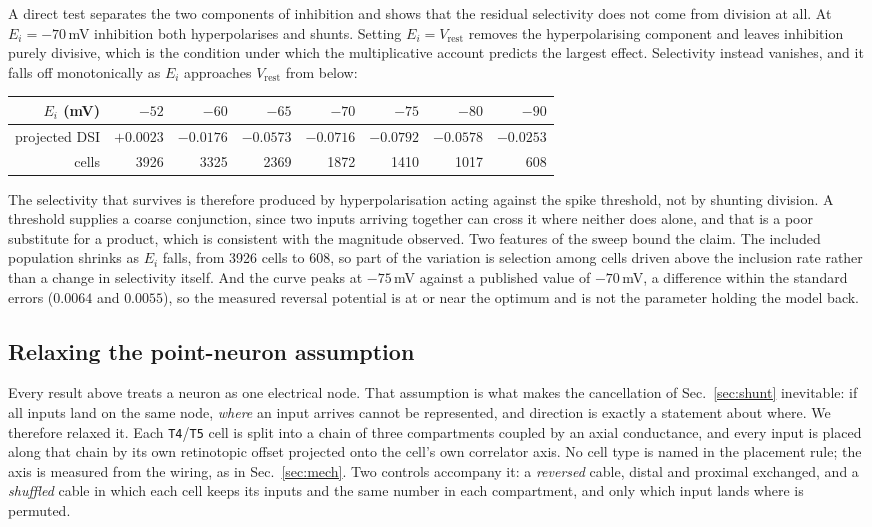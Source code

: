 \documentclass[10pt,twoside]{article}
\newcommand{\cell}[1]{\texttt{#1}}
\begin{document}
A direct test separates the two components of inhibition and shows that the
residual selectivity does not come from division at all. At
$E_i = -70$\,mV inhibition both hyperpolarises and shunts. Setting
$E_i = V_{\mathrm{rest}}$ removes the hyperpolarising component and leaves
inhibition purely divisive, which is the condition under which the
multiplicative account predicts the largest effect. Selectivity instead
vanishes, and it falls off monotonically as $E_i$ approaches
$V_{\mathrm{rest}}$ from below:

\begin{center}
\small
\begin{tabular}{rrrrrrrr}
\toprule
$E_i$ (mV) & $-52$ & $-60$ & $-65$ & $-70$ & $-75$ & $-80$ & $-90$\\
\midrule
projected DSI & $+0.0023$ & $-0.0176$ & $-0.0573$ & $-0.0716$ &
$\mathbf{-0.0792}$ & $-0.0578$ & $-0.0253$\\
cells & 3926 & 3325 & 2369 & 1872 & 1410 & 1017 & 608\\
\bottomrule
\end{tabular}
\end{center}

The selectivity that survives is therefore produced by hyperpolarisation
acting against the spike threshold, not by shunting division. A threshold
supplies a coarse conjunction, since two inputs arriving together can cross it
where neither does alone, and that is a poor substitute for a product, which
is consistent with the magnitude observed. Two features of the sweep bound
the claim. The included population shrinks as $E_i$ falls, from 3926 cells to
608, so part of the variation is selection among cells driven above the
inclusion rate rather than a change in selectivity itself. And the curve peaks
at $-75$\,mV against a published value of $-70$\,mV, a difference within the
standard errors ($0.0064$ and $0.0055$), so the measured reversal potential
is at or near the optimum and is not the parameter holding the model back.

\subsection{Relaxing the point-neuron assumption}
\label{sec:dendrite}

Every result above treats a neuron as one electrical node. That assumption is
what makes the cancellation of Sec.~\ref{sec:shunt} inevitable: if all inputs
land on the same node, \emph{where} an input arrives cannot be represented, and
direction is exactly a statement about where. We therefore relaxed it. Each
\cell{T4}/\cell{T5} cell is split into a chain of three compartments coupled by
an axial conductance, and every input is placed along that chain by its own
retinotopic offset projected onto the cell's own correlator axis. No cell type
is named in the placement rule; the axis is measured from the wiring, as in
Sec.~\ref{sec:mech}. Two controls accompany it: a \emph{reversed} cable, distal
and proximal exchanged, and a \emph{shuffled} cable in which each cell keeps its
inputs and the same number in each compartment, and only which input lands
where is permuted.
\end{document}
